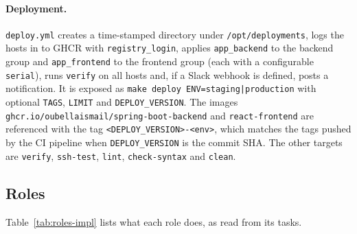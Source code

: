 \paragraph{Deployment.} \texttt{deploy.yml} creates a time-stamped directory under \texttt{/opt/deployments}, logs the hosts in to GHCR with \texttt{registry\_login}, applies \texttt{app\_backend} to the backend group and \texttt{app\_frontend} to the frontend group (each with a configurable \texttt{serial}), runs \texttt{verify} on all hosts and, if a Slack webhook is defined, posts a notification. It is exposed as \texttt{make deploy ENV=staging|production} with optional \texttt{TAGS}, \texttt{LIMIT} and \texttt{DEPLOY\_VERSION}. The images \texttt{ghcr.io/oubellaismail/spring-boot-backend} and \texttt{react-frontend} are referenced with the tag \texttt{<DEPLOY\_VERSION>-<env>}, which matches the tags pushed by the CI pipeline when \texttt{DEPLOY\_VERSION} is the commit SHA. The other targets are \texttt{verify}, \texttt{ssh-test}, \texttt{lint}, \texttt{check-syntax} and \texttt{clean}.

\subsection{Roles}

Table~\ref{tab:roles-impl} lists what each role does, as read from its tasks.

